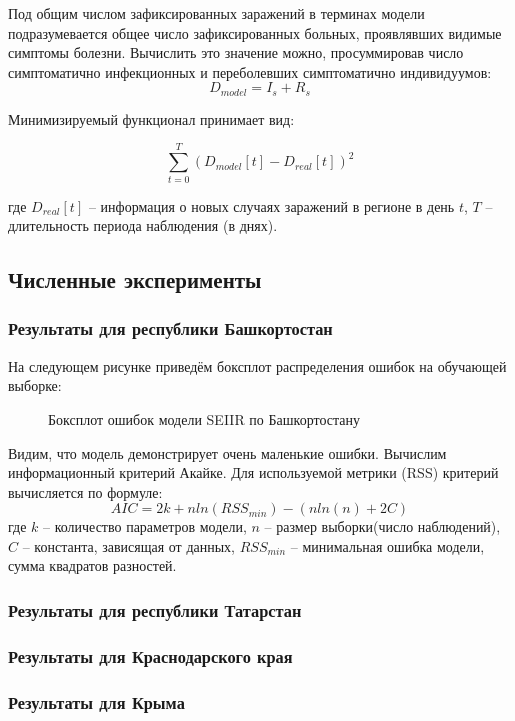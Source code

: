 \documentclass{article}
\begin{document}
\noindent Под общим числом зафиксированных заражений в терминах модели подразумевается общее число зафиксированных больных, проявлявших видимые симптомы болезни. Вычислить это значение можно, просуммировав число симптоматично инфекционных и переболевших симптоматично индивидуумов:
$$D_{model}= I_s+R_s$$

\noindent Минимизируемый функционал принимает вид:

$$\sum_{t=0}^{T}\left(D_{model}[t]-D_{real}[t]\right)^2$$

\noindent где $D_{real}[t]$ -- информация о новых случаях заражений в регионе в день $t$, $T$ -- длительность периода наблюдения (в днях).

\subsection{Численные эксперименты}
\subsubsection{Результаты для республики Башкортостан}

\noindent На следующем рисунке приведём боксплот распределения ошибок на обучающей выборке:

\begin{figure}[H]
    \caption{Боксплот ошибок модели SEIIR по Башкортостану}
	\label{fig:image}
\end{figure}

\noindent Видим, что модель демонстрирует очень маленькие ошибки. Вычислим информационный критерий Акайке. Для используемой метрики (RSS) критерий вычисляется по формуле:
$$AIC = 2k + n ln (RSS_{min}) - (n ln(n) + 2C)$$
где $k$ -- количество параметров модели, $n$ -- размер выборки(число наблюдений), $C$ -- константа, зависящая от данных, $RSS_{min}$ -- минимальная ошибка модели, сумма квадратов разностей. 

\subsubsection{Результаты для республики Татарстан}

\subsubsection{Результаты для Краснодарского края}

\subsubsection{Результаты для Крыма}
\end{document}
